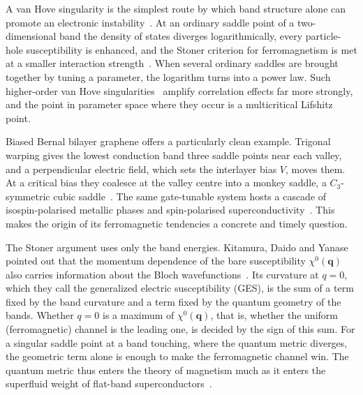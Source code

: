 \documentclass[aps,prb,twocolumn,superscriptaddress,floatfix,nofootinbib]{revtex4-2}
\newcommand{\bq}{\mathbf{q}}
\begin{document}
A van Hove singularity is the simplest route by which band structure alone can promote an electronic instability~\cite{VanHove1953}. At an ordinary saddle point of a two-dimensional band the density of states diverges logarithmically, every particle-hole susceptibility is enhanced, and the Stoner criterion for ferromagnetism is met at a smaller interaction strength~\cite{Stoner1938}. When several ordinary saddles are brought together by tuning a parameter, the logarithm turns into a power law. Such higher-order van Hove singularities~\cite{Yuan2019,Shtyk2017} amplify correlation effects far more strongly, and the point in parameter space where they occur is a multicritical Lifshitz point.

Biased Bernal bilayer graphene offers a particularly clean example. Trigonal warping gives the lowest conduction band three saddle points near each valley, and a perpendicular electric field, which sets the interlayer bias $V$, moves them. At a critical bias they coalesce at the valley centre into a monkey saddle, a $C_3$-symmetric cubic saddle~\cite{Shtyk2017}. The same gate-tunable system hosts a cascade of isospin-polarised metallic phases and spin-polarised superconductivity~\cite{Zhou2022,Seiler2022,delaBarrera2022}. This makes the origin of its ferromagnetic tendencies a concrete and timely question.

The Stoner argument uses only the band energies. Kitamura, Daido and Yanase pointed out that the momentum dependence of the bare susceptibility $\chi^0(\bq)$ also carries information about the Bloch wavefunctions~\cite{Kitamura2024}. Its curvature at $q=0$, which they call the generalized electric susceptibility (GES), is the sum of a term fixed by the band curvature and a term fixed by the quantum geometry of the bands. Whether $q=0$ is a maximum of $\chi^0(\bq)$, that is, whether the uniform (ferromagnetic) channel is the leading one, is decided by the sign of this sum. For a singular saddle point at a band touching, where the quantum metric diverges, the geometric term alone is enough to make the ferromagnetic channel win. The quantum metric thus enters the theory of magnetism much as it enters the superfluid weight of flat-band superconductors~\cite{Peotta2015,Torma2022}.
\end{document}

